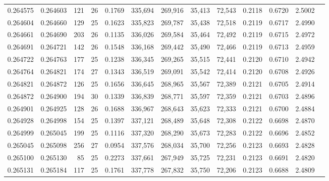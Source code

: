 \begin{tabular}{rrrrrrrrrrrrr}
0.264575 & 0.264603 &   121 &  26 &                                     0.1769 & 335,694 & 269,916 &  35,413 &  72,543 & 0.2118 & 0.6720 & 2.5002 \\
0.264604 & 0.264660 &   129 &  25 &                                     0.1623 & 335,823 & 269,787 &  35,438 &  72,518 & 0.2119 & 0.6717 & 2.4990 \\
0.264661 & 0.264690 &   203 &  26 &                                     0.1135 & 336,026 & 269,584 &  35,464 &  72,492 & 0.2119 & 0.6715 & 2.4972 \\
0.264691 & 0.264721 &   142 &  26 &                                     0.1548 & 336,168 & 269,442 &  35,490 &  72,466 & 0.2119 & 0.6713 & 2.4959 \\
0.264722 & 0.264763 &   177 &  25 &                                     0.1238 & 336,345 & 269,265 &  35,515 &  72,441 & 0.2120 & 0.6710 & 2.4942 \\
0.264764 & 0.264821 &   174 &  27 &                                     0.1343 & 336,519 & 269,091 &  35,542 &  72,414 & 0.2120 & 0.6708 & 2.4926 \\
0.264821 & 0.264872 &   126 &  25 &                                     0.1656 & 336,645 & 268,965 &  35,567 &  72,389 & 0.2121 & 0.6705 & 2.4914 \\
0.264872 & 0.264900 &   194 &  30 &                                     0.1339 & 336,839 & 268,771 &  35,597 &  72,359 & 0.2121 & 0.6703 & 2.4896 \\
0.264901 & 0.264925 &   128 &  26 &                                     0.1688 & 336,967 & 268,643 &  35,623 &  72,333 & 0.2121 & 0.6700 & 2.4884 \\
0.264928 & 0.264998 &   154 &  25 &                                     0.1397 & 337,121 & 268,489 &  35,648 &  72,308 & 0.2122 & 0.6698 & 2.4870 \\
0.264999 & 0.265045 &   199 &  25 &                                     0.1116 & 337,320 & 268,290 &  35,673 &  72,283 & 0.2122 & 0.6696 & 2.4852 \\
0.265045 & 0.265098 &   256 &  27 &                                     0.0954 & 337,576 & 268,034 &  35,700 &  72,256 & 0.2123 & 0.6693 & 2.4828 \\
0.265100 & 0.265130 &    85 &  25 &                                     0.2273 & 337,661 & 267,949 &  35,725 &  72,231 & 0.2123 & 0.6691 & 2.4820 \\
0.265131 & 0.265184 &   117 &  25 &                                     0.1761 & 337,778 & 267,832 &  35,750 &  72,206 & 0.2123 & 0.6688 & 2.4809 \\

\end{tabular}
